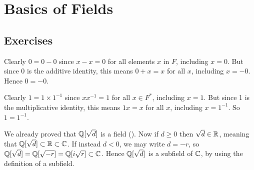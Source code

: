 \section{Basics of Fields}
\subsection*{Exercises}
\begin{questions}
    \item \begin{partquestions}{\alph*}
        \item Clearly $0 = 0 - 0$ since $x - x = 0$ for all elements $x$ in $F$, including $x = 0$. But since 0 is the additive identity, this means $0 + x = x$ for all $x$, including $x = -0$. Hence $0 = -0$.
        \item Clearly $1 = 1\times 1^{-1}$ since $xx^{-1} = 1$ for all $x \in F^\ast$, including $x = 1$. But since 1 is the multiplicative identity, this means $1x = x$ for all $x$, including $x = 1^{-1}$. So $1 = 1^{-1}$.
    \end{partquestions}

    \item We already proved that $\mathbb{Q}[\sqrt{d}]$ is a field (). Now if $d \geq 0$ then $\sqrt{d} \in \mathbb{R}$, meaning that $\mathbb{Q}[\sqrt{d}] \subset \mathbb{R} \subset \mathbb{C}$. If instead $d < 0$, we may write $d = -r$, so $\mathbb{Q}[\sqrt{d}] = \mathbb{Q}[\sqrt{-r}] = \mathbb{Q}[i\sqrt{r}] \subset \mathbb{C}$. Hence $\mathbb{Q}[\sqrt{d}]$ is a subfield of $\mathbb{C}$, by using the definition of a subfield.
\end{questions}

